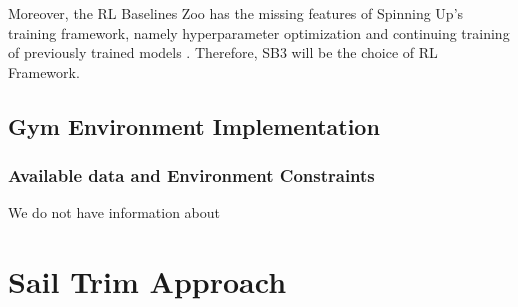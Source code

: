 \documentclass[12pt,twoside]{report}
\begin{document}
Moreover, the RL Baselines Zoo has the missing features of Spinning Up's training framework, namely hyperparameter optimization and continuing training of previously trained models \cite{rl-zoo3}. Therefore, SB3 will be the choice of RL Framework.


\section{Gym Environment Implementation}

\subsection{Available data and Environment Constraints}
We do not have information about










\appendix
{}
\chapter{Sail Trim Approach}

\end{document}
